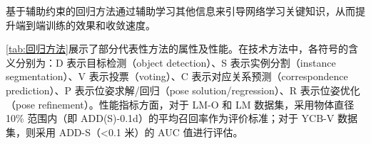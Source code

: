 \par 基于辅助约束的回归方法通过辅助学习其他信息来引导网络学习关键知识，从而提升端到端训练的效果和收敛速度。

\autoref{tab:回归方法}展示了部分代表性方法的属性及性能。在技术方法中，各符号的含义分别为：D 表示目标检测（object detection）、S 表示实例分割（instance segmentation）、V 表示投票（voting）、C 表示对应关系预测（correspondence prediction）、P 表示位姿求解/回归（pose solution/regression）、R 表示位姿优化（pose refinement）。性能指标方面，对于 LM-O 和 LM 数据集，采用物体直径 10\% 范围内（即 ADD(S)-0.1d）的平均召回率作为评价标准；对于 YCB-V 数据集，则采用 ADD-S（<0.1 米）的 AUC 值进行评估。


\begin{table}[!t]
    \centering
    \renewcommand\arraystretch{1}
    \caption{基于回归的方法总结}
\end{table}
